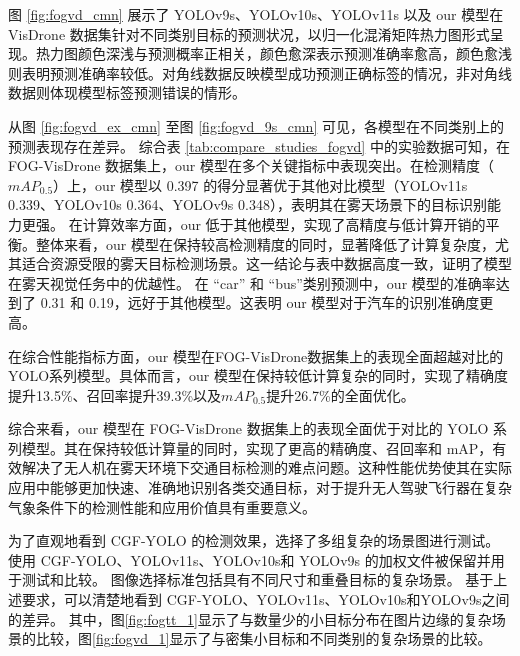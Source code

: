 图 \ref{fig:fogvd_cmn} 展示了 YOLOv9s、YOLOv10s、YOLOv11s 以及 our 模型在 VisDrone 数据集针对不同类别目标的预测状况，以归一化混淆矩阵热力图形式呈现。热力图颜色深浅与预测概率正相关，颜色愈深表示预测准确率愈高，颜色愈浅则表明预测准确率较低。对角线数据反映模型成功预测正确标签的情况，非对角线数据则体现模型标签预测错误的情形。

从图 \ref{fig:fogvd_ex_cmn} 至图 \ref{fig:fogvd_9s_cmn} 可见，各模型在不同类别上的预测表现存在差异。
综合表 \ref{tab:compare_studies_fogvd} 中的实验数据可知，在 FOG-VisDrone 数据集上，our 模型在多个关键指标中表现突出。在检测精度（$mAP_{0.5}$）上，our 模型以 0.397 的得分显著优于其他对比模型（YOLOv11s 0.339、YOLOv10s 0.364、YOLOv9s 0.348），表明其在雾天场景下的目标识别能力更强。
在计算效率方面，our 低于其他模型，实现了高精度与低计算开销的平衡。整体来看，our 模型在保持较高检测精度的同时，显著降低了计算复杂度，尤其适合资源受限的雾天目标检测场景。这一结论与表中数据高度一致，证明了模型在雾天视觉任务中的优越性。
在 “car” 和 “bus”类别预测中，our 模型的准确率达到了 0.31 和 0.19，远好于其他模型。这表明 our 模型对于汽车的识别准确度更高。

在综合性能指标方面，our 模型在FOG-VisDrone数据集上的表现全面超越对比的YOLO系列模型。具体而言，our 模型在保持较低计算复杂的同时，实现了精确度提升13.5\%、召回率提升39.3\%以及$mAP_{0.5}$​提升26.7\%的全面优化。

综合来看，our 模型在 FOG-VisDrone 数据集上的表现全面优于对比的 YOLO 系列模型。其在保持较低计算量的同时，实现了更高的精确度、召回率和 mAP，有效解决了无人机在雾天环境下交通目标检测的难点问题。这种性能优势使其在实际应用中能够更加快速、准确地识别各类交通目标，对于提升无人驾驶飞行器在复杂气象条件下的检测性能和应用价值具有重要意义。

为了直观地看到 CGF-YOLO 的检测效果，选择了多组复杂的场景图进行测试。 使用 CGF-YOLO、YOLOv11s、YOLOv10s和 YOLOv9s 的加权文件被保留并用于测试和比较。 图像选择标准包括具有不同尺寸和重叠目标的复杂场景。 基于上述要求，可以清楚地看到 CGF-YOLO、YOLOv11s、YOLOv10s和YOLOv9s之间的差异。 其中，图\ref{fig:fogtt_1}显示了与数量少的小目标分布在图片边缘的复杂场景的比较，图\ref{fig:fogvd_1}显示了与密集小目标和不同类别的复杂场景的比较。

